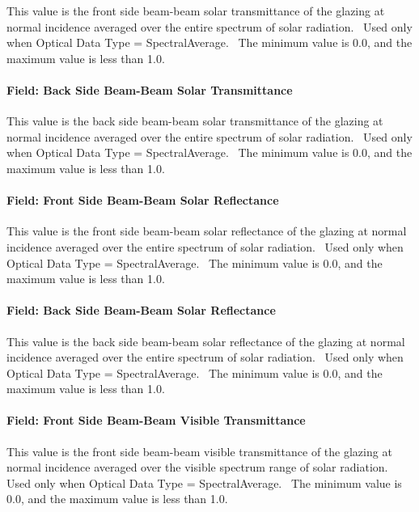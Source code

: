 This value is the front side beam-beam solar transmittance of the glazing at normal incidence averaged over the entire spectrum of solar radiation.~ Used only when Optical Data Type = SpectralAverage.~ The minimum value is 0.0, and the maximum value is less than 1.0.

\paragraph{Field: Back Side Beam-Beam Solar Transmittance}\label{field-back-side-beam-beam-solar-transmittance}

This value is the back side beam-beam solar transmittance of the glazing at normal incidence averaged over the entire spectrum of solar radiation.~ Used only when Optical Data Type = SpectralAverage.~ The minimum value is 0.0, and the maximum value is less than 1.0.

\paragraph{Field: Front Side Beam-Beam Solar Reflectance}\label{field-front-side-beam-beam-solar-reflectance}

This value is the front side beam-beam solar reflectance of the glazing at normal incidence averaged over the entire spectrum of solar radiation.~ Used only when Optical Data Type = SpectralAverage.~ The minimum value is 0.0, and the maximum value is less than 1.0.

\paragraph{Field: Back Side Beam-Beam Solar Reflectance}\label{field-back-side-beam-beam-solar-reflectance}

This value is the back side beam-beam solar reflectance of the glazing at normal incidence averaged over the entire spectrum of solar radiation.~ Used only when Optical Data Type = SpectralAverage.~ The minimum value is 0.0, and the maximum value is less than 1.0.

\paragraph{Field: Front Side Beam-Beam Visible Transmittance}\label{field-front-side-beam-beam-visible-transmittance}

This value is the front side beam-beam visible transmittance of the glazing at normal incidence averaged over the visible spectrum range of solar radiation.~ Used only when Optical Data Type = SpectralAverage.~ The minimum value is 0.0, and the maximum value is less than 1.0.

